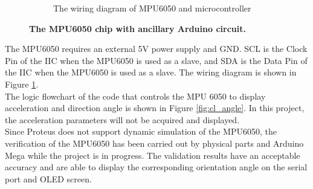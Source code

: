 \begin{figure}[H]
\begin{subfigure}{0.45\textwidth}
        \caption{\centering The wiring diagram of MPU6050 and microcontroller}
        \label{fig:mpu6050_circuit}
    \end{subfigure}
    \caption[The MPU6050 chip with ancillary Arduino circuit]
    {\centering \textbf{The MPU6050 chip with ancillary Arduino circuit.}}
    \label{fig:mpu6050}
\end{figure}
\noindent The MPU6050 requires an external 5V power supply and GND. SCL is the Clock Pin of the IIC when the 
MPU6050 is used as a slave, and SDA is the Data Pin of the IIC when the MPU6050 is used as a slave. The wiring 
diagram is shown in Figure \ref{fig:mpu6050_circuit}. \\
The logic flowchart of the code that controls the MPU 6050 to display acceleration and direction angle is shown 
in Figure \ref{fig:cl_angle}. In this project, the acceleration parameters will not be acquired and displayed. \\
Since Proteus does not support dynamic simulation of the MPU6050, the verification of the MPU6050 has been 
carried out by physical parts and Arduino Mega while the project is in progress. The validation results have 
an acceptable accuracy and are able to display the corresponding orientation angle on the serial port and 
OLED screen. 

